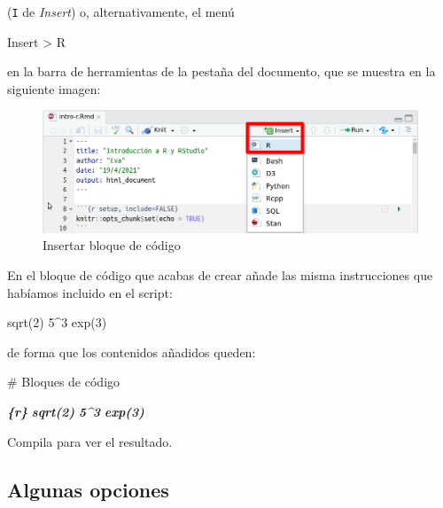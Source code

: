 \documentclass[
  title=normal,
  notoc,
  bib=normal]{mnye}
\newenvironment{Shaded}{\begin{snugshade}}{\end{snugshade}}
\newcommand{\FunctionTok}[1]{\textcolor[rgb]{0.00,0.00,0.00}{#1}}
\newcommand{\InformationTok}[1]{\textcolor[rgb]{0.56,0.35,0.01}{\textbf{\textit{#1}}}}
\newcommand{\NormalTok}[1]{#1}
\begin{document}
(\texttt{I} de \emph{Insert}) o, alternativamente, el menú

\begin{menu}
Insert \textgreater{} R

\end{menu}

en la barra de herramientas de la pestaña del documento, que se muestra en la siguiente imagen:

\begin{figure}

{\centering \includegraphics[width=1\linewidth]{images/insert-r} 

}

\caption{Insertar bloque de código}\label{fig:unnamed-chunk-17}
\end{figure}

En el bloque de código que acabas de crear añade las misma instrucciones que habíamos incluido en el script:

\begin{Shaded}
\begin{Highlighting}[]
\NormalTok{sqrt(2)}
\NormalTok{5\^{}3}
\NormalTok{exp(3)}
\end{Highlighting}
\end{Shaded}

de forma que los contenidos añadidos queden:

\begin{Shaded}
\begin{Highlighting}[]
\FunctionTok{\# Bloques de código}

\InformationTok{\textasciigrave{}\textasciigrave{}\textasciigrave{}\{r\}}
\InformationTok{sqrt(2)}
\InformationTok{5\^{}3}
\InformationTok{exp(3)}
\InformationTok{\textasciigrave{}\textasciigrave{}\textasciigrave{}}
\end{Highlighting}
\end{Shaded}

Compila para ver el resultado.

\hypertarget{algunas-opciones}{%
\subsection{Algunas opciones}\label{algunas-opciones}}
\end{document}
